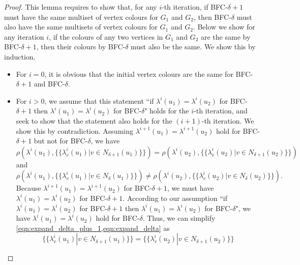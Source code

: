 \begin{proof}
\label{proof:as_express_as}
This lemma requires to show that, for any $i$-th iteration, if BFC-$\delta+1$ must have the same multiset of vertex colours for $G_1$ and $G_2$, then BFC-$\delta$ must also have the same multisets of vertex colours for $G_1$ and $G_2$.
Below we show for any iteration $i$, if the colours of any two vertices in $G_1$ and $G_2$ are the same by BFC-$\delta+1$, then their colours by BFC-$\delta$ must also be the same.
We show this by induction.
 
\begin{itemize}
    \item For $i=0$, it is obvious that the initial vertex colours are the same for BFC-$\delta+1$ and BFC-$\delta$.
    \item For $i>0$, we assume that this statement ``if $\lambda^{i}(u_1) = \lambda^{i}(u_2)$ for BFC-$\delta+1$ then $\lambda^{i}(u_1) = \lambda^{i}(u_2)$ for BFC-$\delta$" holds for the $i$-th iteration, and seek to show that the statement also holds for the $(i+1)$-th iteration. We show this by contradiction. Assuming $\lambda^{i+1}(u_1) = \lambda^{i+1}(u_2)$ hold for BFC-$\delta+1$ but not for BFC-$\delta$, we have
    \begin{equation}
    \label{eqn:expand_delta_plus_1}
        \rho(\lambda^{i}(u_1), \{\!\!\{\lambda^{i}_{v}(u_1)| v\in N_{\delta+1}(u_1)\}\!\!\}) 
        =  \rho(\lambda^{i}(u_2), \{\!\!\{\lambda^{i}_{v}(u_2)| v\in N_{\delta+1}(u_2)\}\!\!\})
    \end{equation}
    and 
    \begin{equation}
    \label{eqn:expand_delta}
        \rho(\lambda^{i}(u_1), \{\!\!\{\lambda^{i}_{v}(u_1)| v\in N_{\delta}(u_1)\}\!\!\}) 
        \neq  \rho(\lambda^{i}(u_2), \{\!\!\{\lambda^{i}_{v}(u_2)| v\in N_{\delta}(u_2)\}\!\!\}).
    \end{equation}
    Because $\lambda^{i+1}(u_1) = \lambda^{i+1}(u_2)$ for BFC-$\delta+1$, we must have $\lambda^{i}(u_1) = \lambda^{i}(u_2)$ for BFC-$\delta+1$. According to our assumption ``if $\lambda^{i}(u_1) = \lambda^{i}(u_2)$ for BFC-$\delta+1$ then $\lambda^{i}(u_1) = \lambda^{i}(u_2)$ for BFC-$\delta$", we have $\lambda^{i}(u_1) = \lambda^{i}(u_2)$ hold for BFC-$\delta$. Thus, we can simplify \cref{eqn:expand_delta_plus_1,eqn:expand_delta} as 
    \begin{equation}
        \label{eqn:color_multiset_delta_plus_1}
        \{\!\!\{\lambda^{i}_{v}(u_1)| v\in N_{\delta+1}(u_1)\}\!\!\}  =  \{\!\!\{\lambda^{i}_{v}(u_2)| v\in N_{\delta+1}(u_2)\}\!\!\}

\end{equation}
\end{itemize}
\end{proof}
